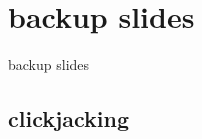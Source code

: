 \date{}
\title{}
\date{}
\usepackage[outputdir=latex.out]{minted}

\begin{frame}
    \titlepage
\end{frame}
\usetikzlibrary{arrows.meta,calc,shapes.callouts,positioning}



\section{backup slides}
\begin{frame}{backup slides}
\end{frame}





\subsection{clickjacking}



